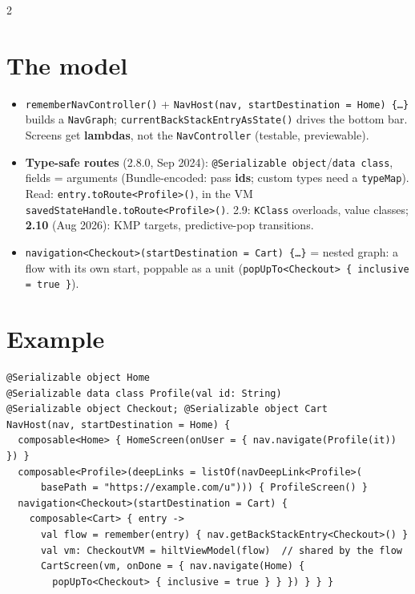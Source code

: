 \documentclass[8pt]{extarticle}
\begin{document}
\begin{multicols}{2}
\raggedright

\section{The model}
\begin{itemize}\raggedright
  \item \texttt{rememberNavController()} + \texttt{NavHost(nav, startDestination = Home) \{…\}}
        builds a \texttt{NavGraph}; \texttt{currentBackStackEntryAsState()} drives the bottom
        bar. Screens get \textbf{lambdas}, not the \texttt{NavController} (testable, previewable).
  \item \textbf{Type-safe routes} (2.8.0, Sep 2024): \texttt{@Serializable object}/\texttt{data
        class}, fields = arguments (Bundle-encoded: pass \textbf{ids}; custom types need a
        \texttt{typeMap}). Read: \texttt{entry.toRoute<Profile>()}, in the VM
        \texttt{savedStateHandle.toRoute<Profile>()}. 2.9: \texttt{KClass} overloads, value
        classes; \textbf{2.10} (Aug 2026): KMP targets, predictive-pop transitions.
  \item \texttt{navigation<Checkout>(startDestination = Cart) \{…\}} = nested graph: a flow
        with its own start, poppable as a unit (\texttt{popUpTo<Checkout> \{ inclusive = true \}}).
\end{itemize}

\section{Example}
\begin{lstlisting}[language=KotlinSheet]
@Serializable object Home
@Serializable data class Profile(val id: String)
@Serializable object Checkout; @Serializable object Cart
NavHost(nav, startDestination = Home) {
  composable<Home> { HomeScreen(onUser = { nav.navigate(Profile(it)) }) }
  composable<Profile>(deepLinks = listOf(navDeepLink<Profile>(
      basePath = "https://example.com/u"))) { ProfileScreen() }
  navigation<Checkout>(startDestination = Cart) {
    composable<Cart> { entry ->
      val flow = remember(entry) { nav.getBackStackEntry<Checkout>() }
      val vm: CheckoutVM = hiltViewModel(flow)  // shared by the flow
      CartScreen(vm, onDone = { nav.navigate(Home) {
        popUpTo<Checkout> { inclusive = true } } }) } } }
\end{lstlisting}


\end{multicols}
\end{document}
